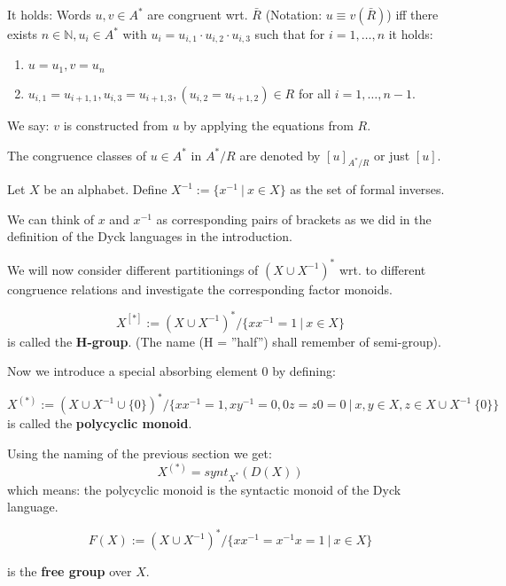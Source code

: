 It holds: Words $u, v \in A^*$ are congruent wrt. $\bar{R}$ (Notation: $u
\equiv v (\bar{R})$) iff there exists $n \in \mathbb{N}, u_i \in A^*$ with $u_i
= u_{i,1} \cdot u_{i,2} \cdot u_{i,3}$ such that for $i = 1, \ldots, n$ it
holds:

\begin{enumerate}
  \item $u = u_1, v = u_n$
  \item $u_{i,1} = u_{i+1,1}, u_{i,3} = u_{i+1,3}, (u_{i,2} = u_{i+1,2}) \in R$
  for all $i = 1, \ldots, n-1$.
\end{enumerate}

We say: $v$ is constructed from $u$ by applying the equations from $R$.

The congruence classes of $u \in A^*$ in $A^* / R$ are denoted by $[u]_{A^*/R}$
or just $[u]$.

\begin{definition}
Let $X$ be an alphabet. Define $X^{-1} := \{ x^{-1}\ |\ x \in X \}$ as the set
of formal inverses.
\end{definition}

We can think of $x$ and $x^{-1}$ as corresponding pairs of
brackets as we did in the definition of the Dyck languages in the introduction.

We will now consider different partitionings of $(X \cup X^{-1})^*$ wrt. to
different congruence relations and investigate the corresponding factor monoids.

\begin{definition}
\[ X^{[*]} := (X \cup X^{-1})^* / \{ x x^{-1} = 1\ |\ x \in X \} \]
is called the {\bf H-group}. (The name (H = ''half'') shall remember of
semi-group).
\end{definition}

Now we introduce a special absorbing element $0$ by defining:
\begin{definition}
\[ X^{(*)} := (X \cup X^{-1} \cup \{0\})^* / \{ x x^{-1} = 1, x y^{-1} = 0, 0 z
= z 0 = 0\ |\ x,y \in X, z \in X \cup X^{-1} \ \{0\} \} \]
is called the {\bf polycyclic monoid}.
\end{definition}

Using the naming of the previous section we get:
\[ X^{(*)} = synt_{X^*}(D(X)) \]
which means: the polycyclic monoid is the syntactic monoid of the Dyck language.

\begin{definition}
\[ F(X) := (X \cup X^{-1})^* / \{ x x^{-1} = x^{-1} x = 1 \ |\ x \in X \} \]
\end{definition}
is the {\bf free group} over $X$.

